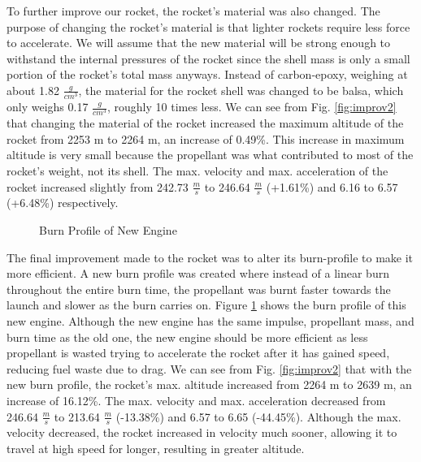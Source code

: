 \documentclass{report}
\begin{document}
\noindent To further improve our rocket, the rocket's material was also changed.
The purpose of changing the rocket's material is that lighter rockets require less force to accelerate.
We will assume that the new material will be strong enough to withstand the internal pressures of the rocket since the shell mass is only a small portion of the rocket's total mass anyways.
Instead of carbon-epoxy, weighing at about 1.82 $\frac{g}{cm^3}$, the material for the rocket shell was changed to be balsa, which only weighs 0.17 $\frac{g}{cm^3}$, roughly 10 times less.
We can see from Fig. \ref{fig:improv2} that changing the material of the rocket increased the maximum altitude of the rocket from 2253 m to 2264 m, an increase of 0.49\%.
This increase in maximum altitude is very small because the propellant was what contributed to most of the rocket's weight, not its shell.
The max. velocity and max. acceleration of the rocket increased slightly from 242.73 $\frac{m}{s}$ to 246.64 $\frac{m}{s}$ (+1.61\%) and 6.16 to 6.57 (+6.48\%) respectively.
\\

\begin{figure}[h!]
    \centering
    \caption{Burn Profile of New Engine}
    \label{fig:burnprof}
\end{figure}

\noindent The final improvement made to the rocket was to alter its burn-profile to make it more efficient.
A new burn profile was created where instead of a linear burn throughout the entire burn time, the propellant was burnt faster towards the launch and slower as the burn carries on.
Figure \ref{fig:burnprof} shows the burn profile of this new engine.
Although the new engine has the same impulse, propellant mass, and burn time as the old one, the new engine should be more efficient as less propellant is wasted trying to accelerate the rocket after it has gained speed, reducing fuel waste due to drag.
We can see from Fig. \ref{fig:improv2} that with the new burn profile, the rocket's max. altitude increased from 2264 m to 2639 m, an increase of 16.12\%.
The max. velocity and max. acceleration decreased from 246.64 $\frac{m}{s}$ to 213.64 $\frac{m}{s}$ (-13.38\%) and 6.57 to 6.65 (-44.45\%).
Although the max. velocity decreased, the rocket increased in velocity much sooner, allowing it to travel at high speed for longer, resulting in greater altitude. 
\end{document}
